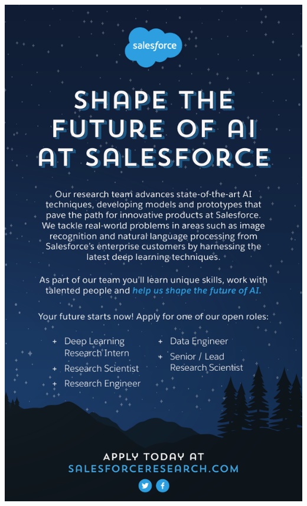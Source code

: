 \thispagestyle{empty}
\begin{center}
  \vfill
  \includegraphics[width=\textwidth]{content/ads/full/salesforce.pdf}
  \vfill
\end{center}

